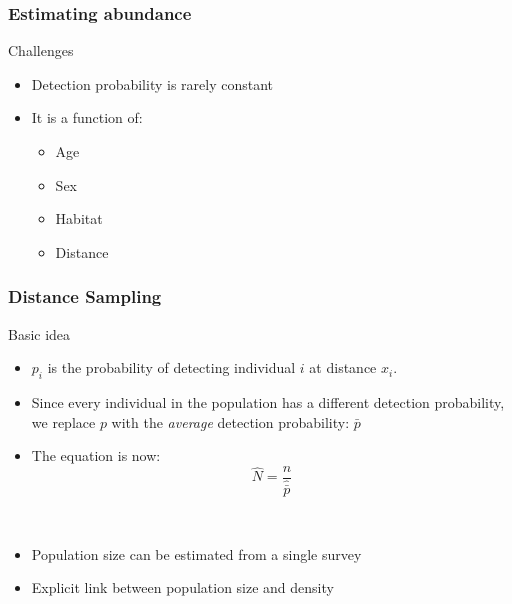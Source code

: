 \documentclass[color=usenames,dvipsnames,handout]{beamer}\usepackage[]{graphicx}\usepackage[]{xcolor}
\begin{document}
\begin{frame}
  \frametitle{Estimating abundance}
  \large
  {%
    Challenges}
  \begin{itemize}
    \item<1-> Detection probability is rarely constant
    \item<2-> It is a function of: %
    \begin{itemize}
      \large
      \item Age
      \item Sex
      \item Habitat
      \item \alert{Distance}
    \end{itemize}
  \end{itemize}

\end{frame}







\begin{frame}
  \frametitle{Distance Sampling}
  \large
  {%
    Basic idea} \\
  \begin{itemize}
  \item<1-> $p_i$ is the probability of detecting individual $i$ at
    distance $x_i$.
  \item<2-> Since every individual in the population has a different
    detection probability, we replace $p$ with the {\it average}
    detection probability: $\bar{p}$
  \item<3-> The equation is now: \\
    \[
      \hat{N} = \frac{n}{\hat{\bar{p}}}
    \]
  \end{itemize}
  \vspace{0.1cm}
   \\
    \begin{itemize}
      \item<5-> Population size can be estimated from a single survey
      \item<6-> Explicit link between population size and density
    \end{itemize}
\end{frame}
\end{document}
